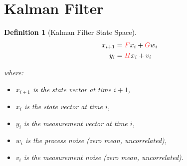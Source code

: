 \documentclass[a4 paper]{article}
\numberwithin{equation}{section}
\theoremstyle{boldStyle}
\theoremstyle{boldBlueStyle}
\theoremstyle{boldPurpleStyle}
\theoremstyle{boldRedStyle}
\newtheorem{definition}{Definition}[section]
\begin{document}


\section{Kalman Filter}


\begin{definition}[Kalman Filter State Space] 
  \begin{equation}
    \begin{aligned}
      x_{i+1} &= \tred{F} x_i + \tred{G} w_i \\
      y_i &= \tred{H} x_i + v_i
    \end{aligned}
  \end{equation}

  where:
\begin{itemize}
    \item \( x_{i+1} \) is the state vector at time \( i+1 \),
    \item \( x_i \) is the state vector at time \( i \),
    \item \( y_i \) is the measurement vector at time \( i \),
    \item \( w_i \) is the process noise (zero mean, uncorrelated),
    \item \( v_i \) is the measurement noise (zero mean, uncorrelated).
\end{itemize}
\end{definition}
\end{document}

